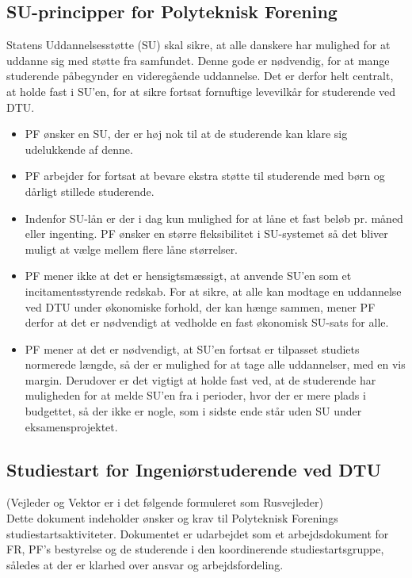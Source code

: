 \subsection{SU-principper for Polyteknisk Forening}
Statens Uddannelsesstøtte (SU) skal sikre, at alle danskere har mulighed for at uddanne sig med støtte fra samfundet. Denne gode er nødvendig, for at mange studerende påbegynder en videregående uddannelse. Det er derfor helt centralt, at holde fast i SU’en, for at sikre fortsat fornuftige levevilkår for studerende ved DTU.
\begin{itemize}
\item PF ønsker en SU, der er høj nok til at de studerende kan klare sig udelukkende af denne.
\item PF arbejder for fortsat at bevare ekstra støtte til studerende med børn og dårligt stillede studerende.
\item Indenfor SU-lån er der i dag kun mulighed for at låne et fast beløb pr. måned eller ingenting. PF ønsker en større fleksibilitet i SU-systemet så det bliver muligt at vælge mellem flere låne størrelser.
\item PF mener ikke at det er hensigtsmæssigt, at anvende SU’en som et incitamentsstyrende redskab. For at sikre, at alle kan modtage en uddannelse ved DTU under økonomiske forhold, der kan hænge sammen, mener PF derfor at det er nødvendigt at vedholde en fast økonomisk SU-sats for alle.
\item PF mener at det er nødvendigt, at SU’en fortsat er tilpasset studiets normerede længde, så der er mulighed for at tage alle uddannelser, med en vis margin. Derudover er det vigtigt at holde fast ved, at de studerende har muligheden for at melde SU’en fra i perioder, hvor der er mere plads i budgettet, så der ikke er nogle, som i sidste ende står uden SU under eksamensprojektet.
\end{itemize}

\subsection{Studiestart for Ingeniørstuderende ved DTU}
(Vejleder og Vektor er i det følgende formuleret som Rusvejleder)\\
Dette dokument indeholder ønsker og krav til Polyteknisk Forenings studiestartsaktiviteter. Dokumentet er udarbejdet som et arbejdsdokument for FR, PF’s bestyrelse og de studerende i den koordinerende studiestartsgruppe, således at der er klarhed over ansvar og arbejdsfordeling.\\

